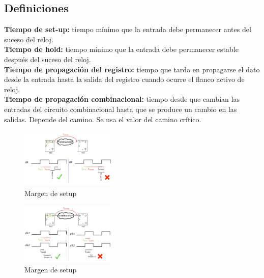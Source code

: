 \subsection{Definiciones}
\noindent\textbf{Tiempo de set-up:} tiempo mínimo que la entrada debe permanecer antes del suceso del reloj.\\
\textbf{Tiempo de hold:} tiempo mínimo que la entrada debe permanecer estable después del suceso del reloj.\\
\textbf{Tiempo de propagación del registro:} tiempo que tarda en propagarse el dato desde la entrada hasta la salida del registro cuando ocurre el flanco activo de reloj.\\
\textbf{Tiempo de propagación combinacional:} tiempo desde que cambian las entradas del circuito combinacional hasta que se produce un cambio en las salidas. Depende del camino. Se usa el valor del camino crítico.\\
\begin{multicols}{2}
    \begin{figure}[H]
        \centering
        \includegraphics[width=0.4\textwidth]{images/Tema_2/Margen_setup.PNG}
        \caption{Margen de setup}
    \end{figure}
    \vfill
    \null
    \begin{figure}[H]
        \centering
        \includegraphics[width=0.4\textwidth]{images/Tema_2/Margen_hold.PNG}
        \caption{Margen de setup}
    \end{figure}
\end{multicols}
